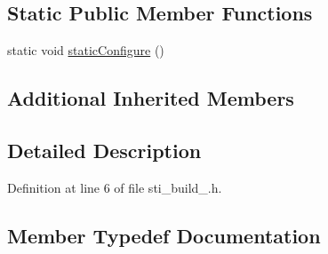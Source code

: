 \subsection*{Static Public Member Functions}
\begin{DoxyCompactItemize}
\item 
static void \hyperlink{structsm__starcraft__ai_1_1build__inner__states_1_1StiBuild2_a811f387766855eeba5679d7943ccdee1}{static\+Configure} ()
\end{DoxyCompactItemize}
\subsection*{Additional Inherited Members}


\subsection{Detailed Description}


Definition at line 6 of file sti\+\_\+build\+\_.\+h.



\subsection{Member Typedef Documentation}
\mbox{\label{structsm__starcraft__ai_1_1build__inner__states_1_1StiBuild2_ab615bc2995682a7a80cdf4d5ddcad22c}} 
